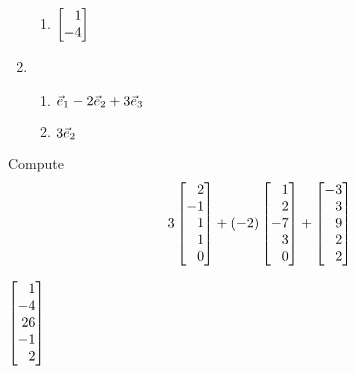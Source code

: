 \begin{exercises}
\begin{problist}
\begin{solution}
\begin{enumerate}
\begin{enumerate}
		                \item $\mat{1\\-4}$
		            \end{enumerate}
		        \item
		            \begin{enumerate}
		                \item ${\vec e_1} - 2{\vec e_2} + 3{\vec e_3}$
		                \item $3{\vec e_2}$
		            \end{enumerate}
		    \end{enumerate}
		\end{solution}

		\prob
		Compute
		\[
			3\mat{2\\-1\\1\\1\\0}+
			(-2)\mat{1\\2\\-7\\3\\0}+
			\mat{-3\\3\\9\\2\\2}
		\]
		\begin{solution}
		    $\mat{1\\-4\\26\\-1\\2}$
		\end{solution}


\end{problist}
\end{exercises}
